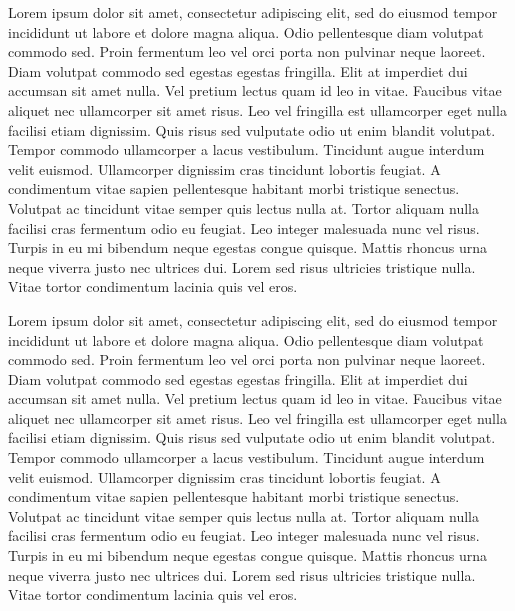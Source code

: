 Lorem ipsum dolor sit amet, consectetur adipiscing elit, sed do eiusmod tempor incididunt ut labore et dolore magna aliqua. Odio pellentesque diam volutpat commodo sed. Proin fermentum leo vel orci porta non pulvinar neque laoreet. Diam volutpat commodo sed egestas egestas fringilla. Elit at imperdiet dui accumsan sit amet nulla. Vel pretium lectus quam id leo in vitae. Faucibus vitae aliquet nec ullamcorper sit amet risus. Leo vel fringilla est ullamcorper eget nulla facilisi etiam dignissim. Quis risus sed vulputate odio ut enim blandit volutpat. Tempor commodo ullamcorper a lacus vestibulum. Tincidunt augue interdum velit euismod. Ullamcorper dignissim cras tincidunt lobortis feugiat. A condimentum vitae sapien pellentesque habitant morbi tristique senectus. Volutpat ac tincidunt vitae semper quis lectus nulla at. Tortor aliquam nulla facilisi cras fermentum odio eu feugiat. Leo integer malesuada nunc vel risus. Turpis in eu mi bibendum neque egestas congue quisque. Mattis rhoncus urna neque viverra justo nec ultrices dui. Lorem sed risus ultricies tristique nulla. Vitae tortor condimentum lacinia quis vel eros.

Lorem ipsum dolor sit amet, consectetur adipiscing elit, sed do eiusmod tempor incididunt ut labore et dolore magna aliqua. Odio pellentesque diam volutpat commodo sed. Proin fermentum leo vel orci porta non pulvinar neque laoreet. Diam volutpat commodo sed egestas egestas fringilla. Elit at imperdiet dui accumsan sit amet nulla. Vel pretium lectus quam id leo in vitae. Faucibus vitae aliquet nec ullamcorper sit amet risus. Leo vel fringilla est ullamcorper eget nulla facilisi etiam dignissim. Quis risus sed vulputate odio ut enim blandit volutpat. Tempor commodo ullamcorper a lacus vestibulum. Tincidunt augue interdum velit euismod. Ullamcorper dignissim cras tincidunt lobortis feugiat. A condimentum vitae sapien pellentesque habitant morbi tristique senectus. Volutpat ac tincidunt vitae semper quis lectus nulla at. Tortor aliquam nulla facilisi cras fermentum odio eu feugiat. Leo integer malesuada nunc vel risus. Turpis in eu mi bibendum neque egestas congue quisque. Mattis rhoncus urna neque viverra justo nec ultrices dui. Lorem sed risus ultricies tristique nulla. Vitae tortor condimentum lacinia quis vel eros.

